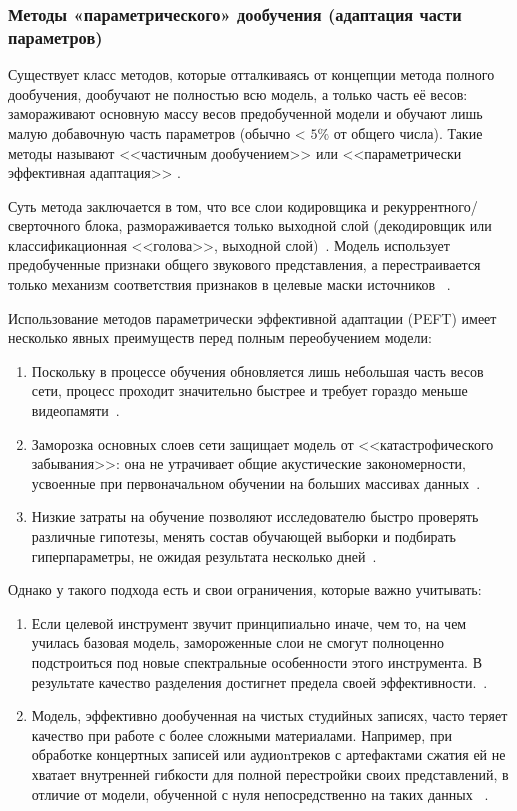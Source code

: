 \documentclass[14pt]{extarticle}
\begin{document}
\subsubsection{Методы «параметрического» дообучения (адаптация части параметров)}

Существует класс методов, которые отталкиваясь от концепции метода полного дообучения, дообучают не полностью
всю модель, а только часть её весов:  замораживают основную массу весов предобученной модели и обучают лишь 
малую добавочную часть параметров (обычно < $5\%$ от общего числа). Такие методы называют <<частичным дообучением>>
или <<параметрически эффективная адаптация>> \cite{peft}.

Суть метода заключается в том, что все слои кодировщика и рекуррентного/сверточного блока, размораживается 
только выходной слой (декодировщик или классификационная <<голова>>, выходной слой)~\cite{goodfellow}. 
Модель использует предобученные признаки общего звукового представления, 
а перестраивается только механизм соответствия признаков в целевые маски источников ~\cite{goodfellow}.

Использование методов параметрически эффективной адаптации (PEFT) имеет несколько явных преимуществ перед полным переобучением модели:
\begin{enumerate}[label=\arabic*)]
\item Поскольку в процессе обучения обновляется лишь небольшая часть весов сети, процесс проходит значительно быстрее и 
требует гораздо меньше видеопамяти~\cite{goodfellow}.
\item Заморозка основных слоев сети защищает модель от <<катастрофического забывания>>: она не утрачивает общие акустические 
закономерности, усвоенные при первоначальном обучении на больших массивах данных~\cite{SpeechSep, goodfellow}.
\item Низкие затраты на обучение позволяют исследователю быстро проверять различные гипотезы, менять состав обучающей 
выборки и подбирать гиперпараметры, не ожидая результата несколько дней~\cite{goodfellow}.
\end{enumerate}

Однако у такого подхода есть и свои ограничения, которые важно учитывать:
\begin{enumerate}[label=\arabic*)]
\item Если целевой инструмент звучит принципиально иначе, чем то, на чем училась базовая модель, замороженные слои 
не смогут полноценно подстроиться под новые спектральные особенности этого инструмента. 
В результате качество разделения достигнет предела своей эффективности.~\cite{SpeechSep}.
\item Модель, эффективно дообученная на чистых студийных записях, часто теряет качество при работе с более сложными 
материалами. Например, при обработке концертных записей или аудиоnтреков с артефактами сжатия ей не хватает внутренней гибкости 
для полной перестройки своих представлений, в отличие от модели, обученной с нуля непосредственно на таких данных ~\cite{SpeechSep}.
\end{enumerate}
\end{document}
